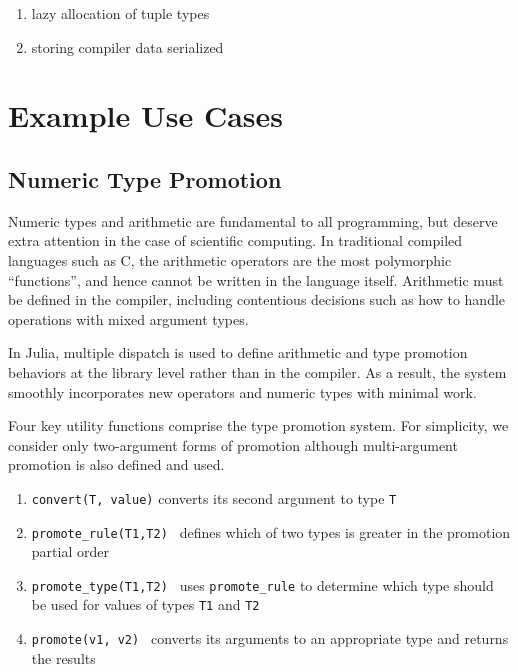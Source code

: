 \documentclass[9pt]{sigplanconf}
\begin{document}
\begin{enumerate}
\item lazy allocation of tuple types
\item storing compiler data serialized
\end{enumerate}

\section{Example Use Cases}



\subsection{Numeric Type Promotion}

Numeric types and arithmetic are fundamental to all programming, but deserve
extra attention in the case of scientific computing.
In traditional compiled languages such as C, the arithmetic operators are the
most polymorphic ``functions'', and hence cannot be written in the language
itself. Arithmetic must be defined in the compiler, including contentious
decisions such as how to handle operations with mixed argument types.

In Julia, multiple dispatch is used to define arithmetic and type
promotion behaviors at the library level rather than in the compiler.
As a result, the system smoothly incorporates new
operators and numeric types with minimal work.

Four key utility functions comprise the type promotion system.
For simplicity, we consider only two-argument forms of promotion
although multi-argument promotion is also defined and used.

\begin{enumerate}
\item {\tt convert(T, value)} converts its second argument to type {\tt T}
\item {\tt promote\_rule(T1,T2) } defines which of two types is greater in
the promotion partial order
\item {\tt promote\_type(T1,T2) } uses {\tt promote\_rule} to determine which
type should be used for values of types {\tt T1} and {\tt T2}
\item {\tt promote(v1, v2) } converts its arguments to an appropriate type
and returns the results
\end{enumerate}
\end{document}
